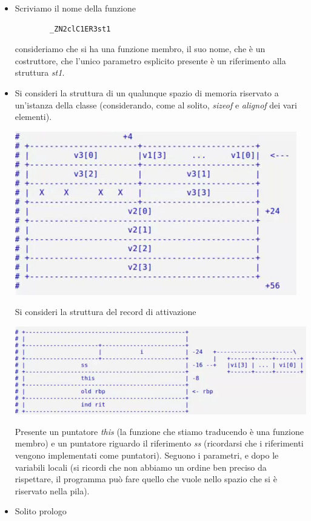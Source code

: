\begin{itemize}
	\item Scriviamo il nome della funzione
	\begin{verbatim}
		_ZN2clC1ER3st1
	\end{verbatim}
	consideriamo che si ha una funzione membro, il suo nome, che è un costruttore, che l'unico parametro esplicito presente è un riferimento alla struttura \emph{st1}.
	\item Si consideri la struttura di un qualunque spazio di memoria riservato a un'istanza della classe (considerando, come al solito, \emph{sizeof} e \emph{alignof} dei vari elementi).
	\begin{center}
		\includegraphics{img/46.PNG}
	\end{center}  
	Si consideri la struttura del record di attivazione
	\begin{center}
		\includegraphics{img/47.PNG}
	\end{center}  
	Presente un puntatore \emph{this} (la funzione che stiamo traducendo è una funzione membro) e un puntatore riguardo il riferimento \emph{ss} (ricordarsi che i riferimenti vengono implementati come puntatori). Seguono i parametri, e dopo le variabili locali (si ricordi che non abbiamo un ordine ben preciso da rispettare, il programma può fare quello che vuole nello spazio che si è riservato nella pila).
	\item Solito prologo
	\begin{verbatim}

\end{verbatim}
\end{itemize}
